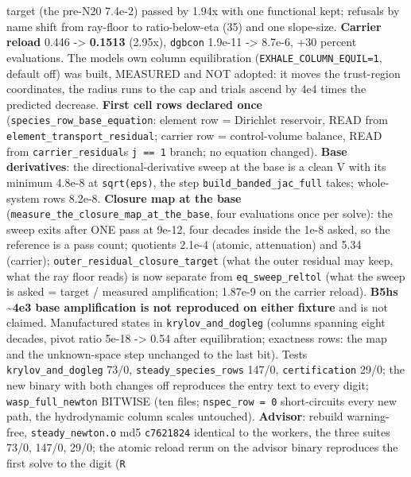 \documentclass[english,a4paper]{my_memo}
\begin{document}
\begin{itemize}
  target (the pre-N20 7.4e-2) passed by 1.94x with one functional kept;
  refusals by name shift from ray-floor to ratio-below-eta (35) and one
  slope-size. \textbf{Carrier reload} 0.446 -\textgreater{} \textbf{0.1513} (2.95x), \texttt{dgbcon}
  1.9e-11 -\textgreater{} 8.7e-6, +30 percent evaluations. The model\textquotesingle s own column
  equilibration (\texttt{EXHALE\_COLUMN\_EQUIL=1}, default off) was built, MEASURED
  and NOT adopted: it moves the trust-region coordinates, the radius runs
  to the cap and trials ascend by 4e4 times the predicted decrease. \textbf{First
  cell rows declared once} (\texttt{species\_row\_base\_equation}: element row =
  Dirichlet reservoir, READ from \texttt{element\_transport\_residual}; carrier row =
  control-volume balance, READ from \texttt{carrier\_residual}\textquotesingle s \texttt{j\ ==\ 1} branch;
  no equation changed). \textbf{Base derivatives}: the directional-derivative
  sweep at the base is a clean V with its minimum 4.8e-8 at \texttt{sqrt(eps)},
  the step \texttt{build\_banded\_jac\_full} takes; whole-system rows 8.2e-8.
  \textbf{Closure map at the base} (\texttt{measure\_the\_closure\_map\_at\_the\_base}, four
  evaluations once per solve): the sweep exits after ONE pass at 9e-12,
  four decades inside the 1e-8 asked, so the reference is a pass count;
  quotients 2.1e-4 (atomic, attenuation) and 5.34 (carrier);
  \texttt{outer\_residual\_closure\_target} (what the outer residual may keep, what
  the ray floor reads) is now separate from \texttt{eq\_sweep\_reltol} (what the
  sweep is asked = target / measured amplification; 1.87e-9 on the carrier
  reload). \textbf{B5h\textquotesingle s \textasciitilde4e3 base amplification is not reproduced on either
  fixture} and is not claimed. Manufactured states in \texttt{krylov\_and\_dogleg}
  (columns spanning eight decades, pivot ratio 5e-18 -\textgreater{} 0.54 after
  equilibration; exactness rows: the map and the unknown-space step
  unchanged to the last bit). Tests \texttt{krylov\_and\_dogleg} 73/0,
  \texttt{steady\_species\_rows} 147/0, \texttt{certification} 29/0; the new binary with
  both changes off reproduces the entry text to every digit;
  \texttt{wasp\_full\_newton} BITWISE (ten files; \texttt{nspec\_row\ =\ 0} short-circuits
  every new path, the hydrodynamic column scales untouched). \textbf{Advisor}:
  rebuild warning-free, \texttt{steady\_newton.o} md5 \texttt{c7621824} identical to the
  worker\textquotesingle s, the three suites 73/0, 147/0, 29/0; the atomic reload rerun on
  the advisor binary reproduces the first solve to the digit (\texttt{\textbar{}\textbar{}R\textbar{}\textbar{}}

\end{itemize}
\end{document}

